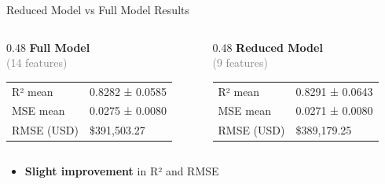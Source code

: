 \documentclass{beamer}
\begin{document}
\begin{frame}{Reduced Model vs Full Model Results}
    \begin{block}{}
        \begin{columns}
            \begin{column}{0.48\textwidth}
                \centering
                \textbf{Full Model}\\
                \textcolor{gray}{\small(14 features)}
                \vspace{0.3cm}
                \begin{tabular}{@{}ll@{}}
                    R² mean & 0.8282 ± 0.0585 \\
                    MSE mean & 0.0275 ± 0.0080 \\
                    RMSE (USD) & \$391{,}503.27 \\
                \end{tabular}
            \end{column}
            \begin{column}{0.48\textwidth}
                \centering
                \textbf{Reduced Model}\\
                \textcolor{gray}{\small(9 features)}
                \vspace{0.3cm}
                \begin{tabular}{@{}ll@{}}
                    R² mean & 0.8291 ± 0.0643 \\
                    MSE mean & 0.0271 ± 0.0080 \\
                    RMSE (USD) & \$389{,}179.25 \\
                \end{tabular}
            \end{column}
        \end{columns}
    \end{block}
    
    \vspace{0.5cm}
    \begin{block}{}
        \begin{itemize}
            \item \textbf{Slight improvement} in R² and RMSE
        \end{itemize}
    \end{block}
\end{frame}
\end{document}
